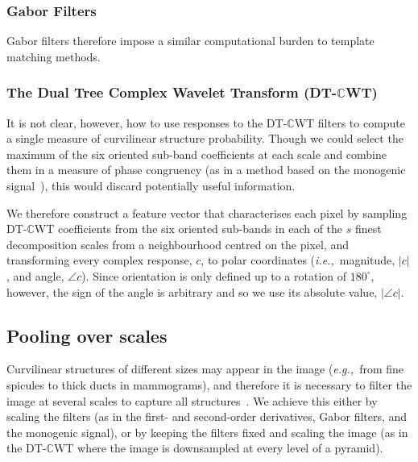 \documentclass{IEEEtran}
\def\eg{\emph{e.g.,}}
\def\ie{\emph{i.e.,}}
\def\dtcwt{DT-$\mathbb{C}$WT}
\begin{document}
\subsubsection{Gabor Filters}
%
Gabor filters therefore impose a similar computational burden to template matching methods.

\subsubsection{The Dual Tree Complex Wavelet Transform (\dtcwt{})}
%

It is not clear, however, how to use responses to the \dtcwt{} filters to compute a single measure of curvilinear structure probability. Though we could select the maximum of the six oriented sub-band coefficients at each scale and combine them in a measure of phase congruency (as in a method based on the monogenic signal~\cite{Wai_etal_MICCAI04}), this would discard potentially useful information.

We therefore construct a feature vector that characterises each pixel by sampling \dtcwt{} coefficients from the six oriented sub-bands in each of the $s$ finest decomposition scales from a neighbourhood centred on the pixel, and transforming every complex response, $c$, to polar coordinates (\ie~magnitude, $|c|$, and angle, $\angle c$). Since orientation is only defined up to a rotation of $180^\circ$, however, the sign of the angle is arbitrary and so we use its absolute value, $|\angle c|$.

\subsection{Pooling over scales}
Curvilinear structures of different sizes may appear in the image (\eg~from fine spicules to thick ducts in mammograms), and therefore it is necessary to filter the image at several scales to capture all structures~\cite{Lindeberg_IJCV98b}. We achieve this either by scaling the filters (as in the first- and second-order derivatives, Gabor filters, and the monogenic signal), or by keeping the filters fixed and scaling the image (as in the \dtcwt{} where the image is downsampled at every level of a pyramid).
\end{document}
